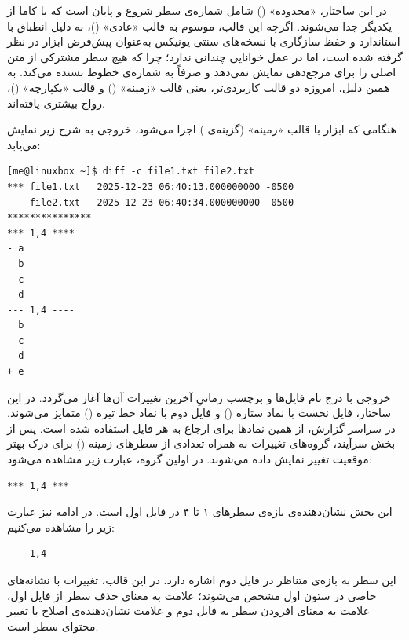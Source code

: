 در این ساختار، «محدوده» () شامل شماره‌ی سطر شروع و پایان است که با کاما از یکدیگر جدا می‌شوند. اگرچه این قالب، موسوم به قالب «عادی» ()، به دلیل انطباق با استاندارد  و حفظ سازگاری با نسخه‌های سنتی یونیکس به‌عنوان پیش‌فرض ابزار  در نظر گرفته شده است، اما در عمل خوانایی چندانی ندارد؛ چرا که هیچ سطر مشترکی از متن اصلی را برای مرجع‌دهی نمایش نمی‌دهد و صرفاً به شماره‌ی خطوط بسنده می‌کند. به همین دلیل، امروزه دو قالب کاربردی‌تر، یعنی قالب «زمینه» () و قالب «یکپارچه» ()، رواج بیشتری یافته‌اند.

هنگامی که ابزار  با قالب «زمینه» (گزینه‌ی ) اجرا می‌شود، خروجی به شرح زیر نمایش می‌یابد:

\begin{latin}
\begin{lstlisting}
[me@linuxbox ~]$ diff -c file1.txt file2.txt
*** file1.txt	2025-12-23 06:40:13.000000000 -0500
--- file2.txt	2025-12-23 06:40:34.000000000 -0500
***************
*** 1,4 ****
- a
  b
  c
  d
--- 1,4 ----
  b
  c
  d
+ e
\end{lstlisting}
\end{latin}

خروجی با درج نام فایل‌ها و برچسب زمانیِ آخرین تغییرات آن‌ها آغاز می‌گردد. در این ساختار، فایل نخست با نماد ستاره (\cmd{***}) و فایل دوم با نماد خط تیره (\cmd{---}) متمایز می‌شوند. در سراسر گزارش، از همین نمادها برای ارجاع به هر فایل استفاده شده است. پس از بخش سرآیند، گروه‌های تغییرات به همراه تعدادی از سطرهای زمینه () برای درک بهتر موقعیت تغییر نمایش داده می‌شوند. در اولین گروه، عبارت زیر مشاهده می‌شود:

\begin{latin}
\begin{lstlisting}
*** 1,4 ***
\end{lstlisting}
\end{latin}

این بخش نشان‌دهنده‌ی بازه‌ی سطرهای ۱ تا ۴ در فایل اول است. در ادامه نیز عبارت زیر را مشاهده می‌کنیم:

\begin{latin}
\begin{lstlisting}
--- 1,4 ---
\end{lstlisting}
\end{latin}

این سطر به بازه‌ی متناظر در فایل دوم اشاره دارد. در این قالب، تغییرات با نشانه‌های خاصی در ستون اول مشخص می‌شوند؛ علامت \cmd{-} به معنای حذف سطر از فایل اول، علامت \cmd{+} به معنای افزودن سطر به فایل دوم و علامت \cmd{!} نشان‌دهنده‌ی اصلاح یا تغییر محتوای سطر است.

